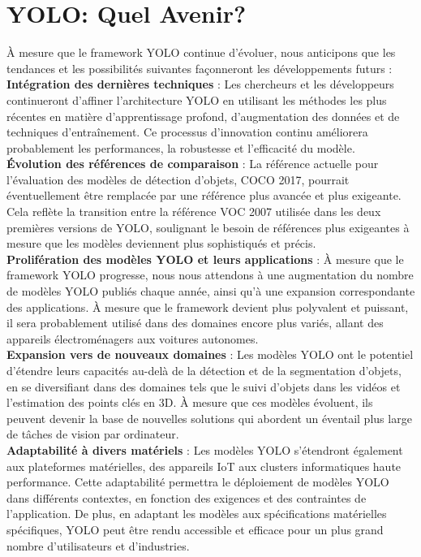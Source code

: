 \documentclass{article}
\begin{document}
\section{YOLO: Quel Avenir?}

À mesure que le framework YOLO continue d'évoluer, nous anticipons que les tendances et les possibilités suivantes façonneront les développements futurs :
\vspace{.2cm}\\
\textbf{Intégration des dernières techniques} : Les chercheurs et les développeurs continueront d'affiner l'architecture YOLO en utilisant les méthodes les plus récentes en matière d'apprentissage profond, d'augmentation des données et de techniques d'entraînement. Ce processus d'innovation continu améliorera probablement les performances, la robustesse et l'efficacité du modèle.
\vspace{.2cm}\\
\textbf{Évolution des références de comparaison} : La référence actuelle pour l'évaluation des modèles de détection d'objets, COCO 2017, pourrait éventuellement être remplacée par une référence plus avancée et plus exigeante. Cela reflète la transition entre la référence VOC 2007 utilisée dans les deux premières versions de YOLO, soulignant le besoin de références plus exigeantes à mesure que les modèles deviennent plus sophistiqués et précis.
\vspace{.2cm}\\
\textbf{Prolifération des modèles YOLO et leurs applications} : À mesure que le framework YOLO progresse, nous nous attendons à une augmentation du nombre de modèles YOLO publiés chaque année, ainsi qu'à une expansion correspondante des applications. À mesure que le framework devient plus polyvalent et puissant, il sera probablement utilisé dans des domaines encore plus variés, allant des appareils électroménagers aux voitures autonomes.
\vspace{.2cm}\\
\textbf{Expansion vers de nouveaux domaines} : Les modèles YOLO ont le potentiel d'étendre leurs capacités au-delà de la détection et de la segmentation d'objets, en se diversifiant dans des domaines tels que le suivi d'objets dans les vidéos et l'estimation des points clés en 3D. À mesure que ces modèles évoluent, ils peuvent devenir la base de nouvelles solutions qui abordent un éventail plus large de tâches de vision par ordinateur.
\vspace{.2cm}\\
\textbf{Adaptabilité à divers matériels} : Les modèles YOLO s'étendront également aux plateformes matérielles, des appareils IoT aux clusters informatiques haute performance. Cette adaptabilité permettra le déploiement de modèles YOLO dans différents contextes, en fonction des exigences et des contraintes de l'application. De plus, en adaptant les modèles aux spécifications matérielles spécifiques, YOLO peut être rendu accessible et efficace pour un plus grand nombre d'utilisateurs et d'industries.


  
  
\end{document}

